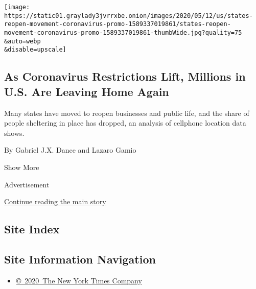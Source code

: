 \begin{enumerate}
  \texttt{[image: https://static01.graylady3jvrrxbe.onion/images/2020/05/12/us/states-reopen-movement-coronavirus-promo-1589337019861/states-reopen-movement-coronavirus-promo-1589337019861-thumbWide.jpg?quality=75\\\&auto=webp\\\&disable=upscale]}

  \hypertarget{as-coronavirus-restrictions-lift-millions-in-us-are-leaving-home-again}{%
  \subsection{As Coronavirus Restrictions Lift, Millions in U.S. Are
  Leaving Home
  Again}\label{as-coronavirus-restrictions-lift-millions-in-us-are-leaving-home-again}}

  Many states have moved to reopen businesses and public life, and the
  share of people sheltering in place has dropped, an analysis of
  cellphone location data shows.

  By Gabriel J.X. Dance and Lazaro Gamio
\end{enumerate}

Show More

Advertisement

\protect\hyperlink{after-mid2}{Continue reading the main story}

\hypertarget{site-index}{%
\subsection{Site Index}\label{site-index}}

\hypertarget{site-information-navigation}{%
\subsection{Site Information
Navigation}\label{site-information-navigation}}

\begin{itemize}
\tightlist
\item
  \href{https://help.nytimes3xbfgragh.onion/hc/en-us/articles/115014792127-Copyright-notice}{©~2020~The
  New York Times Company}
\end{itemize}

